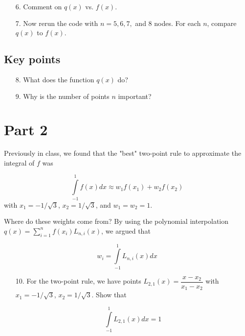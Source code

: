 \documentclass[11pt]{article}
\begin{document}
\begin{enumerate}
\item[6.] Comment on $q(x)$ vs. $f(x)$.

\vspace{2cm}

\item[7.] Now rerun the code with $n=5, 6, 7,$ and $8$ nodes. For each $n$, compare $q(x)$ to $f(x)$.

\vspace{3cm}
\end{enumerate}

\subsection*{Key points}

\begin{enumerate}
\item[8.] What does the function $q(x)$ do?

\vspace{2cm}

\item[9.] Why is the number of points $n$ important?
\end{enumerate}

\newpage

\section*{Part 2}

Previously in class, we found that the "best" two-point rule to approximate the integral of $f$ was

$$\int \limits_{-1}^1 f(x) dx \approx w_1 f(x_1) + w_2 f(x_2)$$
with $x_1 = -1/\sqrt{3}$, $x_2 = 1/\sqrt{3}$, and $w_1 = w_2 = 1$. 

\noindent Where do these weights come from? By using the polynomial interpolation $q(x) = \sum \limits_{i=1}^n f(x_i) L_{n,i}(x)$, we argued that

$$w_i = \int \limits_{-1}^1 L_{n,i}(x) dx$$

\begin{enumerate}
\item[10.] For the two-point rule, we have points $L_{2,1}(x) = \dfrac{x - x_2}{x_1 - x_2}$ with $x_1 = -1/\sqrt{3}$, $x_2 = 1/\sqrt{3}$. Show that

$$\int \limits_{-1}^1 L_{2,1}(x) dx = 1$$
\end{enumerate}
\end{document}
